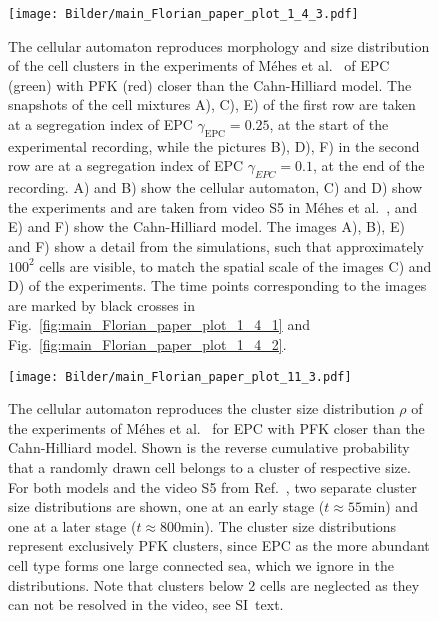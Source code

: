 \documentclass[10pt,letterpaper]{article}
\newcommand{\figref}[1]{Fig.~\ref{fig:#1}}
\begin{document}
\begin{figure}[ht!]
 \centering
 \texttt{[image: Bilder/main\_Florian\_paper\_plot\_1\_4\_3.pdf]}
 \caption{The cellular automaton reproduces morphology and size
   distribution of the cell clusters in the experiments of Méhes et
   al.~\cite{MehMonNemVic2012} of EPC (green) with PFK (red) closer
   than the Cahn-Hilliard model. The snapshots of the cell mixtures
   A), C), E) of the first row are taken at a segregation index of EPC
   $\gamma_\text{EPC}=0.25$, at the start of the experimental
   recording, while the pictures B), D), F) in the second row are at a
   segregation index of EPC $\gamma_{EPC}=0.1$, at the end of the
   recording. A) and B) show the cellular automaton, C) and D) show
   the experiments and are taken from video S5 in Méhes et
   al.~\cite{MehMonNemVic2012}, and E) and F) show the Cahn-Hilliard
   model. The images A), B), E) and F) show a detail from the
   simulations, such that approximately $100^2$ cells are visible, to
   match the spatial scale of the images C) and D) of the experiments.
   The time points corresponding to the images are marked by black
   crosses in \figref{main_Florian_paper_plot_1_4_1} and
   \figref{main_Florian_paper_plot_1_4_2}.}
 \label{fig:main_Florian_paper_plot_1_4_3}
\end{figure}

\begin{figure}[ht!]
 \centering
 \texttt{[image: Bilder/main\_Florian\_paper\_plot\_11\_3.pdf]}
 \caption{The cellular automaton reproduces the cluster size
   distribution $\rho$ of the experiments of Méhes et
   al.~\cite{MehMonNemVic2012} for EPC with PFK closer than the
   Cahn-Hilliard model. Shown is the
   reverse cumulative probability that a randomly drawn cell belongs to a
   cluster of respective size. For both models and the video S5 from
   Ref.~\cite{MehMonNemVic2012}, two separate cluster size
   distributions are shown, one at an early stage ($t\approx55$min)
   and one at a later stage ($t\approx800$min). The cluster size
   distributions represent exclusively PFK clusters, since EPC as the
   more abundant cell type forms one large connected sea, which we
   ignore in the distributions. Note that clusters below $2$ cells are
   neglected as they can not be resolved in the video, see SI~text.}
 \label{fig:main_Florian_paper_plot_11_3}
\end{figure}
\end{document}
